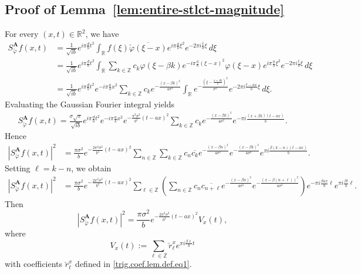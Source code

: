 \documentclass[11pt, reqno]{amsart}
\newcommand{\Z}{\mathbb{Z}}
\newcommand{\R}{\mathbb{R}}
\numberwithin{equation}{section}
\begin{document}
\begin{appendices}
\subsection{Proof of Lemma~\ref{lem:entire-stlct-magnitude}}\label{proof.lem.entire-stlct-magnitude} 
For every $(x,t)\in\R^2$, we have
\begin{align*}
S_{\check{\varphi}}^{\mathbf A}f(x,t) &= \frac{1}{\sqrt{ib}}e^{i\pi \frac{d}{b}t^2}
\int_{\R} f(\xi)\overline{\check{\varphi}(\xi-x)}e^{i\pi\frac{a}{b}\xi^2}e^{-2\pi i\frac{t}{b}\xi}\,d\xi \\
&=\frac{1}{\sqrt{ib}}e^{i\pi \frac{d}{b}t^2}\int_{\R}
\sum_{k\in\Z}c_k \varphi(\xi-\beta k)e^{-i\pi\frac{a}{b}(\xi-x)^2}\varphi(\xi-x)e^{i\pi\frac{a}{b}\xi^2}
e^{-2\pi i\frac{t}{b}\xi}\,d\xi \\
&=\frac{1}{\sqrt{ib}}e^{i\pi \frac{d}{b}t^2}e^{-i\pi\frac{a}{b}x^2}\sum_{k\in\Z}c_k e^{-\frac{(x-\beta k)^2}{4\sigma^2}}\int_{\R}e^{-\frac{(\xi-\frac{x+\beta k}{2})^2}{\sigma^2}}
e^{-2\pi i\frac{t-ax}{b}\xi}\,d\xi.
\end{align*}
Evaluating the Gaussian Fourier integral yields
\begin{align*}
S_{\check{\varphi}}^{\mathbf A}f(x,t) =
\frac{\sigma\sqrt{\pi}}{\sqrt{ib}}e^{i\pi\frac{d}{b}t^2}e^{-i\pi\frac{a}{b}x^2}
e^{-\frac{\pi^2\sigma^2}{b^2}(t-ax)^2}\sum_{k\in\Z}c_k e^{-\frac{(x-\beta k)^2}{4\sigma^2}}
e^{-\pi i\frac{(x+\beta k)(t-ax)}{b}}.
\end{align*}
Hence
\begin{align*}
|S_{\check{\varphi}}^{\mathbf A}f(x,t)|^2&= \frac{\pi\sigma^2}{b}
e^{-\frac{2\pi^2\sigma^2}{b^2}(t-ax)^2}\sum_{n\in\Z}\sum_{k\in\Z}c_n\overline{c_k}
e^{-\frac{(x-\beta n)^2}{4\sigma^2}}e^{-\frac{(x-\beta k)^2}{4\sigma^2}}e^{\pi i\frac{\beta (k-n)(t-ax)}{b}}.
\end{align*}
Setting $\ell=k-n$, we obtain
\begin{align*}
|S_{\check{\varphi}}^{\mathbf A}f(x,t)|^2&=\frac{\pi\sigma^2}{b}e^{-\frac{2\pi^2\sigma^2}{b^2}(t-ax)^2}\sum_{\ell\in\Z}\left(\sum_{n\in\Z}c_n\overline{c_{n+\ell}}e^{-\frac{(x-\beta n)^2}{4\sigma^2}}
e^{-\frac{(x-\beta (n+\ell))^2}{4\sigma^2}}\right)e^{-\pi i\frac{\beta ax}{b}\ell}e^{\pi i\frac{\beta t}{b}\ell}.\end{align*}
Then
$$ |S_{\check{\varphi}}^{\mathbf A}f(x,t)|^2=\frac{\pi\sigma^2}{b}e^{-\frac{2\pi^2\sigma^2}{b^2}(t-ax)^2}V_x(t),$$
where 
\begin{equation}\label{V_x.def.appx}
V_x(t):=\sum_{\ell\in\Z}\breve r_\ell^x e^{\pi i\frac{\beta\ell}{b}t}\end{equation}
with  coefficients $\breve r_\ell^x$ defined in \eqref{trig.coef.lem.def.eq1}.


\end{appendices}
\end{document}
